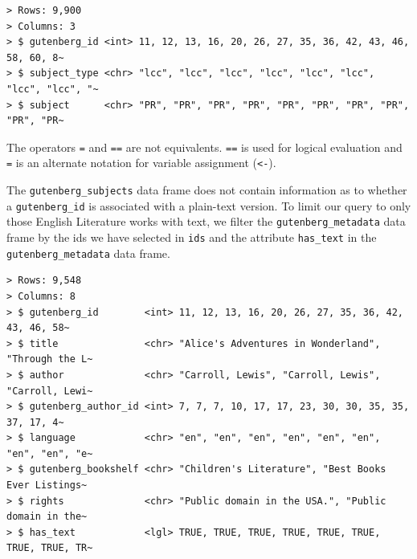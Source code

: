 \documentclass[
  letterpaper,
]{latex/krantz}
\newenvironment{Shaded}{\begin{snugshade}}{\end{snugshade}}
\newcommand{\CommentTok}[1]{\textcolor[rgb]{0.00,0.00,0.00}{\textit{#1}}}
\newcommand{\ConstantTok}[1]{\textcolor[rgb]{0.00,0.00,0.00}{#1}}
\newcommand{\FunctionTok}[1]{\textcolor[rgb]{0.00,0.00,0.00}{#1}}
\newcommand{\NormalTok}[1]{\textcolor[rgb]{0.00,0.00,0.00}{#1}}
\newcommand{\OtherTok}[1]{\textcolor[rgb]{0.00,0.00,0.00}{#1}}
\newcommand{\SpecialCharTok}[1]{\textcolor[rgb]{0.00,0.00,0.00}{#1}}
\begin{document}
\begin{verbatim}
> Rows: 9,900
> Columns: 3
> $ gutenberg_id <int> 11, 12, 13, 16, 20, 26, 27, 35, 36, 42, 43, 46, 58, 60, 8~
> $ subject_type <chr> "lcc", "lcc", "lcc", "lcc", "lcc", "lcc", "lcc", "lcc", "~
> $ subject      <chr> "PR", "PR", "PR", "PR", "PR", "PR", "PR", "PR", "PR", "PR~
\end{verbatim}

\begin{tcolorbox}[enhanced jigsaw, colbacktitle=quarto-callout-warning-color!10!white, arc=.35mm, toprule=.15mm, breakable, colframe=quarto-callout-warning-color-frame, bottomrule=.15mm, opacitybacktitle=0.6, coltitle=black, titlerule=0mm, colback=white, toptitle=1mm, bottomtitle=1mm, title=\textcolor{quarto-callout-warning-color}{\faExclamationTriangle}\hspace{0.5em}{Tip}, rightrule=.15mm, leftrule=.75mm, opacityback=0, left=2mm]

The operators \texttt{=} and \texttt{==} are not equivalents.
\texttt{==} is used for logical evaluation and \texttt{=} is an
alternate notation for variable assignment (\texttt{\textless{}-}).

\end{tcolorbox}

The \texttt{gutenberg\_subjects} data frame does not contain information
as to whether a \texttt{gutenberg\_id} is associated with a plain-text
version. To limit our query to only those English Literature works with
text, we filter the \texttt{gutenberg\_metadata} data frame by the ids
we have selected in \texttt{ids} and the attribute \texttt{has\_text} in
the \texttt{gutenberg\_metadata} data frame.

\begin{Shaded}
\end{Shaded}

\begin{verbatim}
> Rows: 9,548
> Columns: 8
> $ gutenberg_id        <int> 11, 12, 13, 16, 20, 26, 27, 35, 36, 42, 43, 46, 58~
> $ title               <chr> "Alice's Adventures in Wonderland", "Through the L~
> $ author              <chr> "Carroll, Lewis", "Carroll, Lewis", "Carroll, Lewi~
> $ gutenberg_author_id <int> 7, 7, 7, 10, 17, 17, 23, 30, 30, 35, 35, 37, 17, 4~
> $ language            <chr> "en", "en", "en", "en", "en", "en", "en", "en", "e~
> $ gutenberg_bookshelf <chr> "Children's Literature", "Best Books Ever Listings~
> $ rights              <chr> "Public domain in the USA.", "Public domain in the~
> $ has_text            <lgl> TRUE, TRUE, TRUE, TRUE, TRUE, TRUE, TRUE, TRUE, TR~
\end{verbatim}
\end{document}
